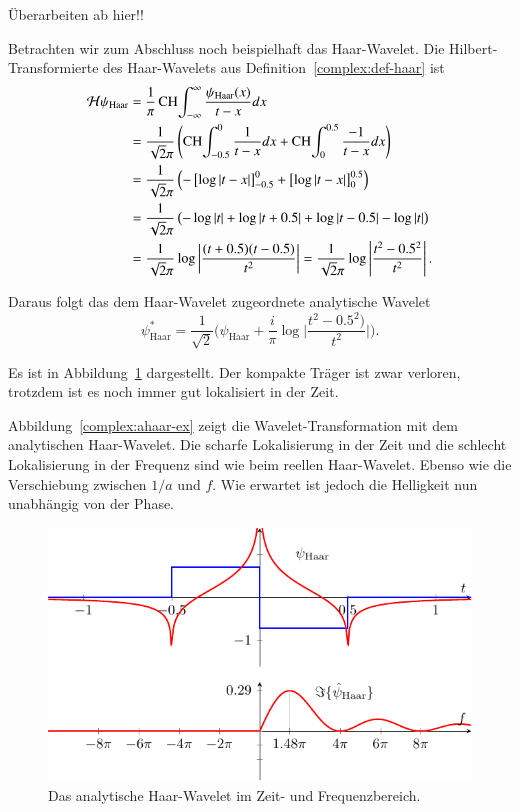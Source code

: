 
\clearpage
{\Huge Überarbeiten ab hier!!}

Betrachten wir zum Abschluss noch beispielhaft das Haar-Wavelet.
Die Hilbert-Transformierte des Haar-Wavelets aus Definition~\ref{complex:def-haar} ist
\begin{align*}
	\Hilb \psi_{\text{Haar}}
	&= \frac{1}{\pi} \CH\int_{-\infty}^{\infty} \frac{\psi_{\text{Haar}}(x)}{t-x} dx\\
	&= \frac{1}{\sqrt2\pi}\left( \CH\int_{-0.5}^{0} \frac{1}{t-x}dx + \CH\int_{0}^{0.5} \frac{-1}{t-x}dx \right)\\
	&= \frac{1}{\sqrt2\pi} \left( -\left[\log \left|t-x\right| \right]_{-0.5}^{0} + \left[\log\left|t-x\right| \right]_{0}^{0.5} \right)\\
	&= \frac{1}{\sqrt2\pi} \left( -\log\left|t\right| + \log\left|t+0.5\right| + \log\left|t-0.5\right| - \log\left|t\right|\right)\\
	&= \frac{1}{\sqrt2\pi} \log\left|\frac{(t+0.5)(t-0.5)}{t^2}\right|
= \frac{1}{\sqrt2\pi} \log\left|\frac{t^2-0.5^2}{t^2}\right|.
\end{align*}

Daraus folgt das dem Haar-Wavelet zugeordnete analytische Wavelet
\[\psi^\ast_{\text{Haar}} = 
\frac{1}{\sqrt{2}}\biggl(\psi_{\text{Haar}} 
+ 
\frac{i}{\pi} \log\biggl|\frac{t^2-0.5^2)}{t^2}\biggr|\biggr).\]

Es ist in Abbildung~\ref{complex:ahaar} dargestellt.
Der kompakte Träger ist zwar verloren, trotzdem ist es noch immer gut lokalisiert in der Zeit.

Abbildung~\ref{complex:ahaar-ex} zeigt die Wavelet-Transformation mit dem analytischen Haar-Wavelet.
Die scharfe Lokalisierung in der Zeit und die schlecht Lokalisierung in der Frequenz sind wie beim reellen Haar-Wavelet. Ebenso wie die Verschiebung zwischen $1/a$ und $f$.
Wie erwartet ist jedoch die Helligkeit nun unabhängig von der Phase.

\begin{figure}
	\centering
	\includegraphics{papers/complex/images/ahaar.pdf}
	\caption{Das analytische Haar-Wavelet im Zeit- und Frequenzbereich.}
	\label{complex:ahaar}
\end{figure}

